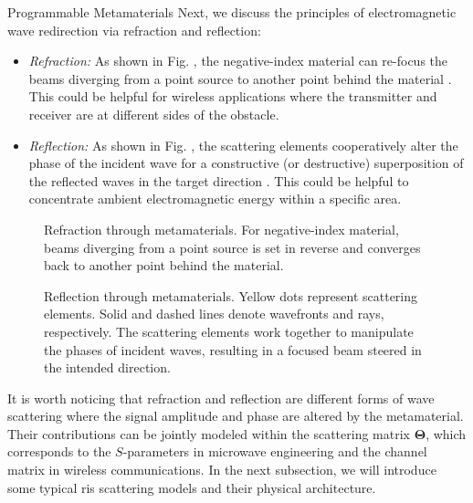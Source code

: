 \begin{section}{}
\begin{subsection}{Programmable Metamaterials}
		Next, we discuss the principles of electromagnetic wave redirection via refraction and reflection:
		\begin{itemize}
			\item \emph{Refraction:} As shown in Fig. , the negative-index material can re-focus the beams diverging from a point source to another point behind the material \cite{Padilla2006}. This could be helpful for wireless applications where the transmitter and receiver are at different sides of the obstacle.
			\item \emph{Reflection:} As shown in Fig. , the scattering elements cooperatively alter the phase of the incident wave for a constructive (or destructive) superposition of the reflected waves in the target direction \cite{Poulakis2022}. This could be helpful to concentrate ambient electromagnetic energy within a specific area.
		\end{itemize}

		\begin{figure}[H]
			\centering
			\caption{Refraction through metamaterials. For negative-index material, beams diverging from a point source is set in reverse and converges back to another point behind the material.}
		\end{figure}
		\begin{figure}[H]
			\centering
			\caption{Reflection through metamaterials. Yellow dots represent scattering elements. Solid and dashed lines denote wavefronts and rays, respectively. The scattering elements work together to manipulate the phases of incident waves, resulting in a focused beam steered in the intended direction.}
		\end{figure}
		It is worth noticing that refraction and reflection are different forms of {wave scattering} where the signal amplitude and phase are altered by the metamaterial.
		Their contributions can be jointly modeled within the scattering matrix $\mathbf{\Theta}$, which corresponds to the $S$-parameters in microwave engineering and the channel matrix in wireless communications.
		In the next subsection, we will introduce some typical \gls{ris} scattering models and their physical architecture.
	\end{subsection}


\end{section}
